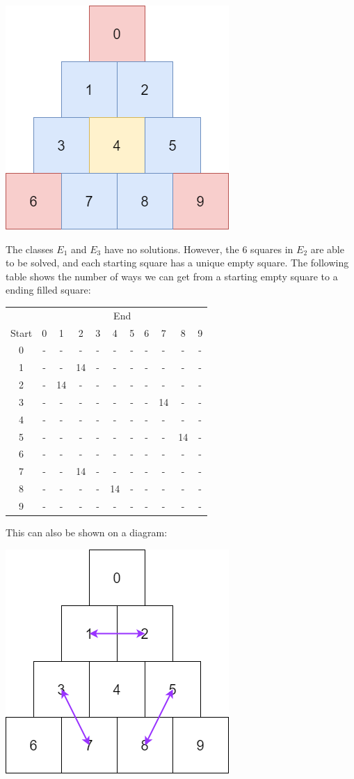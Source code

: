 \documentclass{article}
\begin{document}
\begin{center}
    \includegraphics[width=0.3\linewidth]{"./Images/4EquivalenceClass.png"}
\end{center}

The classes $E_1$ and $E_3$ have no solutions. However, the 6 squares in $E_2$ are able to be solved, and each starting square has a unique empty square. The following table shows the number of ways we can get from a starting empty square to a ending filled square:

\begin{center}
\begin{tabular}{c | c c c c c c c c c c}
    & \multicolumn{10}{c}{End} \\
    Start  & 0 & 1 & 2 & 3 & 4 & 5 & 6 & 7 & 8 & 9 \\
    \hline
    0 & - & - & - & - & - & - & - & - & - & -\\
    1 & - & - & 14 & - & - & - & - & - & - & -\\
    2 & - & 14 & - & - & - & - & - & - & - & -\\
    3 & - & - & - & - & - & - & - & 14 & - & -\\
    4 & - & - & - & - & - & - & - & - & - & -\\
    5 & - & - & - & - & - & - & - & - & 14 & -\\
    6 & - & - & - & - & - & - & - & - & - & -\\
    7 & - & - & 14 & - & - & - & - & - & - & -\\
    8 & - & - & - & - & 14 & - & - & - & - & -\\
    9 & - & - & - & - & - & - & - & - & - & -
\end{tabular}
\end{center}

This can also be shown on a diagram:

\begin{center}
    \includegraphics[width=0.3\linewidth]{"./Images/4Rows.png"}
\end{center}
\end{document}
